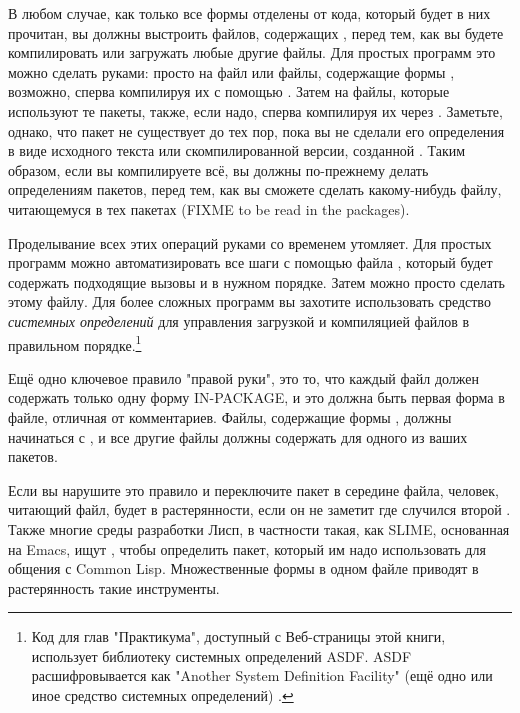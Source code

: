 В любом случае, как только все формы  отделены от кода, который будет в
них прочитан, вы должны выстроить  файлов, содержащих , перед
тем, как вы будете компилировать или загружать любые другие файлы. Для простых программ
это можно сделать руками: просто  на файл или файлы, содержащие формы
, возможно, сперва компилируя их с помощью . Затем
 на файлы, которые используют те пакеты, также, если надо, сперва компилируя их
через . Заметьте, однако, что пакет не существует до тех пор, пока вы
не сделали  его определения в виде исходного текста или скомпилированной
версии, созданной . Таким образом, если вы компилируете всё, вы должны
по-прежнему делать  определениям пакетов, перед тем, как вы сможете сделать
 какому-нибудь файлу, читающемуся в тех пакетах (FIXME to be read in
the packages).

Проделывание всех этих операций руками со временем утомляет.  Для простых программ можно
автоматизировать все шаги с помощью файла , который будет содержать
подходящие вызовы  и  в нужном порядке. Затем можно просто
сделать  этому файлу. Для более сложных программ вы захотите использовать
средство \textit{системных определений} для управления загрузкой и компиляцией файлов в
правильном порядке.\footnote{Код для глав "Практикума", доступный с Веб-страницы этой
  книги, использует библиотеку системных определений ASDF. ASDF расшифровывается как
  "Another System Definition Facility" (ещё одно или иное средство системных определений)
  .}

Ещё одно ключевое правило "правой руки", это то, что каждый файл должен содержать только
одну форму IN-PACKAGE, и это должна быть первая форма в файле, отличная от
комментариев. Файлы, содержащие формы , должны начинаться с
, и все другие файлы должны содержать
 для одного из ваших пакетов.

Если вы нарушите это правило и переключите пакет в середине файла, человек, читающий файл,
будет в растерянности, если он не заметит где случился второй . Также
многие среды разработки Лисп, в частности такая, как SLIME, основанная на Emacs, ищут
, чтобы определить пакет, который им надо использовать для общения с
Common Lisp. Множественные формы  в одном файле приводят в растерянность
такие инструменты.

